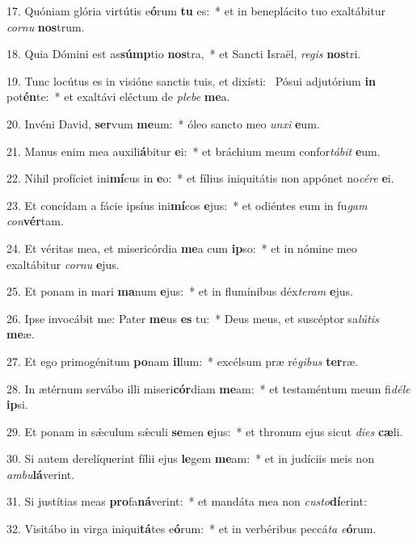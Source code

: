 17. Quóniam glória virtútis e\textbf{ó}rum \textbf{tu} es:~*  et in beneplácito tuo exaltábitur \textit{cor}\textit{nu} \textbf{nos}trum.\

18. Quia Dómini est as\textbf{súmp}tio \textbf{nos}tra,~*  et Sancti Israël, \textit{re}\textit{gis} \textbf{nos}tri.\

19. Tunc locútus es in visióne sanctis tuis, et dixísti: \dag\  Pósui adjutórium \textbf{in} pot\textbf{én}te:~*  et exaltávi eléctum de \textit{ple}\textit{be} \textbf{me}a.\

20. Invéni David, \textbf{ser}vum \textbf{me}um:~*  óleo sancto meo \textit{un}\textit{xi} \textbf{e}um.\

21. Manus enim mea auxili\textbf{á}bitur \textbf{e}i:~*  et bráchium meum confor\textit{tá}\textit{bit} \textbf{e}um.\

22. Nihil profíciet ini\textbf{mí}cus in \textbf{e}o:~*  et fílius iniquitátis non appónet no\textit{cé}\textit{re} \textbf{e}i.\

23. Et concídam a fácie ipsíus ini\textbf{mí}cos \textbf{e}jus:~*  et odiéntes eum in fu\textit{gam} \textit{con}\textbf{vér}tam.\

24. Et véritas mea, et misericórdia \textbf{me}a cum \textbf{ip}so:~*  et in nómine meo exaltábitur \textit{cor}\textit{nu} \textbf{e}jus.\

25. Et ponam in mari \textbf{ma}num \textbf{e}jus:~*  et in flumínibus déx\textit{te}\textit{ram} \textbf{e}jus.\

26. Ipse invocábit me: Pater \textbf{me}us \textbf{es} tu:~*  Deus meus, et suscéptor sa\textit{lú}\textit{tis} \textbf{me}æ.\

27. Et ego primogénitum \textbf{po}nam \textbf{il}lum:~*  excélsum præ ré\textit{gi}\textit{bus} \textbf{ter}ræ.\

28. In ætérnum servábo illi miseri\textbf{cór}diam \textbf{me}am:~*  et testaméntum meum fi\textit{dé}\textit{le} \textbf{ip}si.\

29. Et ponam in sǽculum sǽculi \textbf{se}men \textbf{e}jus:~*  et thronum ejus sicut \textit{di}\textit{es} \textbf{cæ}li.\

30. Si autem derelíquerint fílii ejus \textbf{le}gem \textbf{me}am:~*  et in judíciis meis non \textit{am}\textit{bu}\textbf{lá}verint.\

31. Si justítias meas \textbf{pro}fa\textbf{ná}verint:~*  et mandáta mea non \textit{cus}\textit{to}\textbf{dí}erint:\

32. Visitábo in virga iniqui\textbf{tá}tes e\textbf{ó}rum:~*  et in verbéribus peccá\textit{ta} \textit{e}\textbf{ó}rum.\

